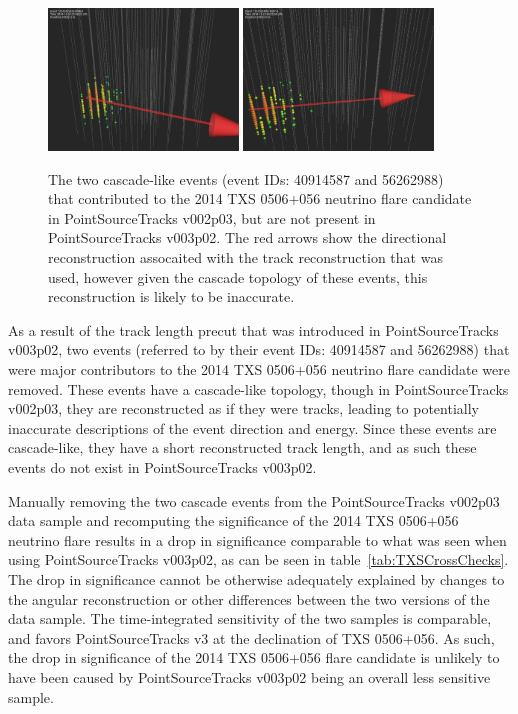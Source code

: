 \begin{figure}[h]
\centering
\includegraphics[width=0.45\textwidth]{figs/125659.png}
\includegraphics[width=0.45\textwidth]{figs/125762.png}
\caption{The two cascade-like events (event IDs: 40914587 and 56262988) that contributed to the 2014 TXS 0506+056 neutrino flare candidate in PointSourceTracks v002p03, but are not present in PointSourceTracks v003p02. The red arrows show the directional reconstruction assocaited with the track reconstruction that was used, however given the cascade topology of these events, this reconstruction is likely to be inaccurate. }
\label{fig:missingevts}
\end{figure}

As a result of the track length precut that was introduced in PointSourceTracks v003p02, two events (referred to by their event IDs: 40914587 and 56262988) that were major contributors to the 2014 TXS 0506+056 neutrino flare candidate were removed. These events have a cascade-like topology, though in PointSourceTracks v002p03, they are reconstructed as if they were tracks, leading to potentially inaccurate descriptions of the event direction and energy. Since these events are cascade-like, they have a short reconstructed track length, and as such these events do not exist in PointSourceTracks v003p02. 

Manually removing the two cascade events from the PointSourceTracks v002p03 data sample and recomputing the significance of the 2014 TXS 0506+056 neutrino flare results in a drop in significance comparable to what was seen when using PointSourceTracks v003p02, as can be seen in table~\ref{tab:TXSCrossChecks}. The drop in significance cannot be otherwise adequately explained by changes to the angular reconstruction or other differences between the two versions of the data sample. The time-integrated sensitivity of the two samples is comparable, and favors PointSourceTracks v3 at the declination of TXS 0506+056. As such, the drop in significance of the 2014 TXS 0506+056 flare candidate is unlikely to have been caused by PointSourceTracks v003p02 being an overall less sensitive sample.

